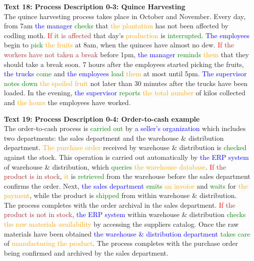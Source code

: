 \textbf{Text 18: Process Description 0-3: Quince Harvesting \cite{text_01}}\\
The quince harvesting process takes place in October and November. Every day, from 7am \textcolor{blue}{the manager} \textcolor{green}{checks} that \textcolor{orange}{the plantation} has not been affected by codling moth. \textcolor{red}{If} \textcolor{brown}{it is affected} that day's \textcolor{orange}{production} is \textcolor{green}{interrupted}. \textcolor{blue}{The employees} begin to \textcolor{green}{pick} \textcolor{orange}{the fruits} at 8am, when the quinces have almost no dew. \textcolor{red}{If} \textcolor{brown}{the workers have not taken a break} before 1pm, \textcolor{blue}{the manager} \textcolor{green}{reminds} \textcolor{orange}{them} that they should take a break soon. 7 hours after the employees started picking the fruits, \textcolor{blue}{the trucks} \textcolor{green}{come} and \textcolor{blue}{the employees} \textcolor{green}{load} \textcolor{orange}{them} at most until 5pm. \textcolor{blue}{The supervisor} \textcolor{green}{notes down} \textcolor{orange}{the spoiled fruit} not later than 30 minutes after the trucks have been loaded. In the evening, \textcolor{blue}{the supervisor} \textcolor{green}{reports} \textcolor{orange}{the total number} of kilos collected and \textcolor{orange}{the hours} the employees have worked.


\textbf{Text 19: Process Description 0-4: Order-to-cash example \cite{text_02}}\\
The order-to-cash process is \textcolor{green}{carried out} by \textcolor{blue}{a seller’s organization} which includes two departments: the sales department and the warehouse \& distribution department. \textcolor{orange}{The purchase order} received by warehouse \& distribution is \textcolor{green}{checked} against the stock. This operation is carried out automatically by \textcolor{blue}{the ERP system} of warehouse \& distribution, which \textcolor{green}{queries} \textcolor{orange}{the warehouse database}. \textcolor{red}{If} \textcolor{brown}{the product is in stock}, \textcolor{orange}{it} is \textcolor{green}{retrieved} from the warehouse before the sales department confirms the order. Next, \textcolor{blue}{the sales department} \textcolor{green}{emits} \textcolor{orange}{an invoice} and \textcolor{green}{waits} for \textcolor{orange}{the payment}, while the product is \textcolor{green}{shipped} from within warehouse \& distribution. The process completes with the order archival in the sales department. \textcolor{red}{If} \textcolor{brown}{the product is not in stock}, \textcolor{blue}{the ERP system} within warehouse \& distribution \textcolor{green}{checks} \textcolor{orange}{the raw materials availability} by accessing the suppliers catalog. Once the raw materials have been obtained \textcolor{blue}{the warehouse \& distribution department} \textcolor{green}{takes care} of \textcolor{orange}{manufacturing the product}. The process completes with the purchase order being confirmed and archived by the sales department.


